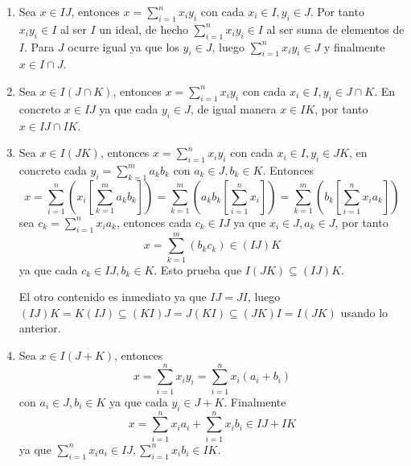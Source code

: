 \begin{proofbox}
    \begin{enumerate}
        \item Sea \(x \in IJ\), entonces \(x = \sum_{i=1}^n x_i y_i\) con cada $x_i \in I, y_i \in J$. Por tanto $x_iy_i \in I$ al ser $I$ un ideal, de hecho $\sum_{i=1}^n x_i y_i \in I$ al ser suma de elementos de $I$. Para $J$ ocurre igual ya que los $y_i \in J$, luego \(\sum_{i=1}^n x_i y_i \in J\) y finalmente \(x \in I \cap J\).

        \item Sea \( x \in I(J \cap K)\), entonces $x = \sum_{i=1}^n x_i y_i$ con cada $x_i \in I, y_i \in J \cap K$. En concreto $x \in IJ$ ya que cada $y_i \in J$, de igual manera $x \in IK$, por tanto \(x \in IJ \cap IK\).
        
        \item Sea \( x \in I(JK)\), entonces $x = \sum_{i=1}^n x_i y_i$ con cada $x_i \in I, y_i \in JK$, en concreto cada $y_i = \sum_{k=1}^m a_k b_k$ con $a_k \in J, b_k \in K$. Entonces
        \[
        x = \sum_{i=1}^n \left( x_i \left[ \sum_{k=1}^m a_k b_k \right]\right) = \sum_{k=1}^m \left( a_k b_k \left[ \sum_{i=1}^n x_i\right] \right) = \sum_{k=1}^m \left( b_k \left[ \sum_{i=1}^n x_i a_k \right] \right)
        \]
        sea $c_k = \sum_{i=1}^n x_i a_k$, entonces cada $c_k \in IJ$ ya que $x_i \in J, a_k \in J$, por tanto 
        \[
        x = \sum_{k=1}^m \left( b_k c_k \right) \in (IJ)K
        \]
        ya que cada $c_k \in IJ, b_k \in K$. Esto prueba que $I(JK) \subseteq (IJ)K$.

        El otro contenido es inmediato ya que $IJ = JI$, luego $(IJ)K = K(IJ) \subseteq (KI)J = J(KI) \subseteq (JK)I = I(JK)$ usando lo anterior.

        \item Sea \(x \in I(J + K)\), entonces
        \[
        x = \sum_{i=1}^n x_i y_i = \sum_{i=1}^n x_i (a_i + b_i)
        \]
        con $a_i \in J, b_i \in K$ ya que cada $y_i \in J + K$. Finalmente
        \[
        x = \sum_{i=1}^n x_i a_i + \sum_{i=1}^n x_i b_i \in IJ + IK
        \]
        ya que $\sum_{i=1}^n x_i a_i \in IJ, \sum_{i=1}^n x_i b_i \in IK$.


\end{enumerate}
\end{proofbox}
